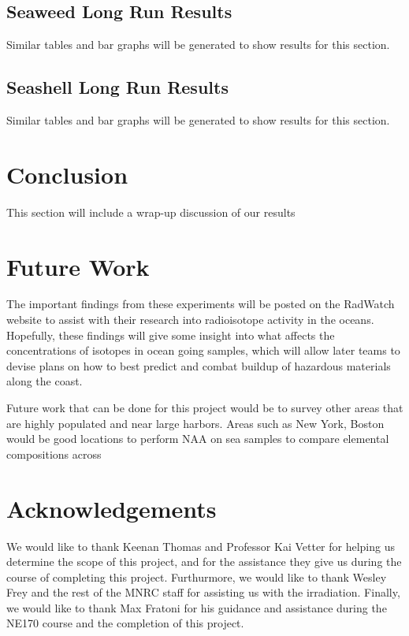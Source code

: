 \documentclass[]{article}
\begin{document}
\subsection{Seaweed Long Run Results}
Similar tables and bar graphs will be generated to show results for this section.
\subsection{Seashell Long Run Results}
Similar tables and bar graphs will be generated to show results for this section.

\section{Conclusion}
This section will include a wrap-up discussion of our results


\section{Future Work}

The important findings from these experiments will be posted on the RadWatch website to assist with their research into radioisotope activity in the oceans. Hopefully, these findings will give some insight into what affects the concentrations of isotopes in ocean going samples, which will allow later teams to devise plans on how to best predict and combat buildup of hazardous materials along the coast. 

Future work that can be done for this project would be to survey other areas that are highly populated and near large harbors. Areas such as New York, Boston would be good locations to perform NAA on sea samples to compare elemental compositions across 



\section{Acknowledgements}

We would like to thank Keenan Thomas and Professor Kai Vetter for helping us determine the scope of this project, and for the assistance they give us during the course of completing this project. Furthurmore, we would like to thank Wesley Frey and the rest of the MNRC staff for assisting us with the irradiation. Finally, we would like to thank Max Fratoni for his guidance and assistance during the NE170 course and the completion of this project.
\end{document}
